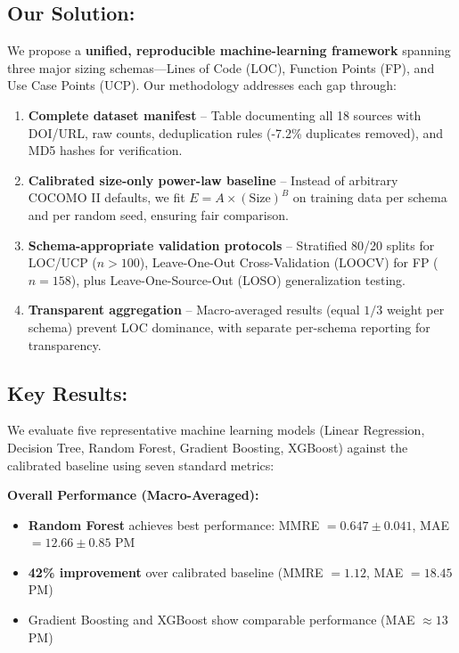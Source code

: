 \documentclass[11pt,a4paper]{article}
\begin{document}
\subsection*{Our Solution:}
We propose a \textbf{unified, reproducible machine-learning framework} spanning three major sizing schemas---Lines of Code (LOC), Function Points (FP), and Use Case Points (UCP). Our methodology addresses each gap through:

\begin{enumerate}
    \item \textbf{Complete dataset manifest} -- Table documenting all 18 sources with DOI/URL, raw counts, deduplication rules (-7.2\% duplicates removed), and MD5 hashes for verification.
    \item \textbf{Calibrated size-only power-law baseline} -- Instead of arbitrary COCOMO II defaults, we fit $E = A \times (\text{Size})^B$ on training data per schema and per random seed, ensuring fair comparison.
    \item \textbf{Schema-appropriate validation protocols} -- Stratified 80/20 splits for LOC/UCP ($n > 100$), Leave-One-Out Cross-Validation (LOOCV) for FP ($n = 158$), plus Leave-One-Source-Out (LOSO) generalization testing.
    \item \textbf{Transparent aggregation} -- Macro-averaged results (equal $1/3$ weight per schema) prevent LOC dominance, with separate per-schema reporting for transparency.
\end{enumerate}

\subsection*{Key Results:}
We evaluate five representative machine learning models (Linear Regression, Decision Tree, Random Forest, Gradient Boosting, XGBoost) against the calibrated baseline using seven standard metrics:

\textbf{Overall Performance (Macro-Averaged):}
\begin{itemize}
    \item \textbf{Random Forest} achieves best performance: MMRE $= 0.647 \pm 0.041$, MAE $= 12.66 \pm 0.85$ PM
    \item \textbf{42\% improvement} over calibrated baseline (MMRE $= 1.12$, MAE $= 18.45$ PM)
    \item Gradient Boosting and XGBoost show comparable performance (MAE $\approx 13$ PM)
\end{itemize}
\end{document}
